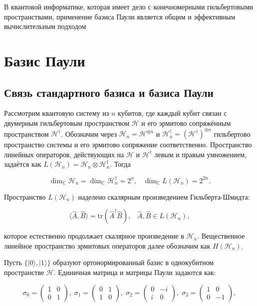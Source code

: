 \documentclass[a4paper]{report}
\begin{document}
В квантовой информатике, которая имеет дело с конечномерными гильбертовыми пространствами, применение базиса Паули является общим и эффективным вычислительным подходом~\cite{Nilsen2006, Tsirulev2020}

\section{Базис Паули}
\subsection{Связь стандартного базиса и базиса \mbox{Паули}}

Рассмотрим квантовую систему из ${n}$ кубитов, где каждый кубит связан с двумерным гильбертовым пространством ${\mathcal{H}}$ и его эрмитово сопряжённым пространством ${\mathcal{H}^\dagger}$. Обозначим через ${\mathcal{H}_n = \mathcal{H}^{\otimes n}}$ и ${\mathcal{H}_n^\dagger = (\mathcal{H}^\dagger)^{\otimes n}}$ гильбертово пространство системы и его эрмитово сопряжение соответственно. Пространство линейных операторов, действующих на ${\mathcal{H}}$ и ${\mathcal{H}^\dagger}$ левым и правым умножением, задаётся как ${L(\mathcal{H}_n) = \mathcal{H}_n \otimes \mathcal{H}_n^\dagger}$. Тогда

$${\dim_\mathbb{C} \mathcal{H}_n = \dim_\mathbb{C} \mathcal{H}_n^\dagger = 2^n,\;\;\;
            \dim_\mathbb{C} L(\mathcal{H}_n) = 2^{2n}.}$$

Пространство ${L(\mathcal{H}_n)}$ наделено скалярным произведением Гильберта-Шмидта:

\begin{equation}\label{eq1}
    \langle\hat{A},\hat{B}\rangle = \mathrm{tr}(\hat{A}^\dagger\hat{B}),\;\;\;
    \hat{A},\hat{B} \in L(\mathcal{H}_n),
\end{equation}

\noindent которое естественно продолжает скалярное произведение в ${\mathcal{H}_n}$. Вещественное линейное пространство эрмитовых операторов далее обозначим как ${H(\mathcal{H}_n)}$.


Пусть ${\{|0\rangle,|1\rangle\}}$ образуют ортонормированный базис в однокубитном пространстве ${\mathcal{H}}$. Единичная матрица и матрицы Паули задаются как:

$${
    \sigma_0 = \begin{pmatrix}1 & 0 \\ 0 & 1\end{pmatrix},\;
    \sigma_1 = \begin{pmatrix}0 & 1 \\ 1 & 0\end{pmatrix},\;
    \sigma_2 = \begin{pmatrix}0 & -i \\ i & 0\end{pmatrix},\;
    \sigma_3 = \begin{pmatrix}1 & 0 \\ 0 & -1\end{pmatrix},
}$$
\end{document}
